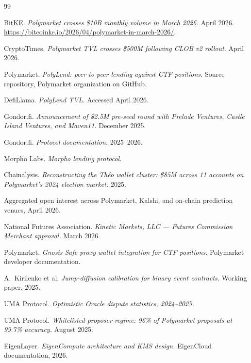 \documentclass[11pt,letterpaper]{article}
\begin{document}
\begin{thebibliography}{99}
\footnotesize

 BitKE. \emph{Polymarket crosses \$10B monthly volume in March 2026.} April 2026. \url{https://bitcoinke.io/2026/04/polymarket-in-march-2026/}.

 CryptoTimes. \emph{Polymarket TVL crosses \$500M following CLOB v2 rollout.} April 2026.

 Polymarket. \emph{PolyLend: peer-to-peer lending against CTF positions.} Source repository, Polymarket organization on GitHub.

 DefiLlama. \emph{PolyLend TVL.} Accessed April 2026.

 Gondor.fi. \emph{Announcement of \$2.5M pre-seed round with Prelude Ventures, Castle Island Ventures, and Maven11.} December 2025.

 Gondor.fi. \emph{Protocol documentation.} 2025--2026.

 Morpho Labs. \emph{Morpho lending protocol.}

 Chainalysis. \emph{Reconstructing the Th\'eo wallet cluster: \$85M across 11 accounts on Polymarket's 2024 election market.} 2025.

 Aggregated open interest across Polymarket, Kalshi, and on-chain prediction venues, April 2026.

 National Futures Association. \emph{Kinetic Markets, LLC --- Futures Commission Merchant approval.} March 2026.

 Polymarket. \emph{Gnosis Safe proxy wallet integration for CTF positions.} Polymarket developer documentation.

 A.~Kirilenko et al. \emph{Jump-diffusion calibration for binary event contracts.} Working paper, 2025.

 UMA Protocol. \emph{Optimistic Oracle dispute statistics, 2024--2025.}

 UMA Protocol. \emph{Whitelisted-proposer regime: 96\% of Polymarket proposals at 99.7\% accuracy.} August 2025.

 EigenLayer. \emph{EigenCompute architecture and KMS design.} EigenCloud documentation, 2026.


\end{thebibliography}
\end{document}

